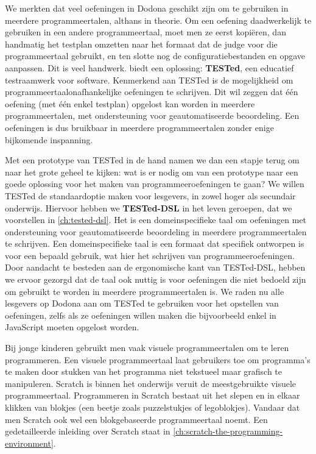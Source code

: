 \documentclass[main]{subfiles}
\begin{document}
We merkten dat veel oefeningen in Dodona geschikt zijn om te gebruiken in meerdere programmeertalen, althans in theorie.
Om een oefening daadwerkelijk te gebruiken in een andere programmeertaal, moet men ze eerst kopiëren, dan handmatig het testplan omzetten naar het formaat dat de judge voor die programmeertaal gebruikt, en ten slotte nog de configuratiebestanden en opgave aanpassen.
Dit is veel handwerk.
 biedt een oplossing: \textbf{TESTed}, een educatief testraamwerk voor software.
Kenmerkend aan TESTed is de mogelijkheid om programmeertaalonafhankelijke oefeningen te schrijven.
Dit wil zeggen dat één oefening (met één enkel testplan) opgelost kan worden in meerdere programmeertalen, met ondersteuning voor geautomatiseerde beoordeling.
Een oefeningen is dus bruikbaar in meerdere programmeertalen zonder enige bijkomende inspanning.

Met een prototype van TESTed in de hand namen we dan een stapje terug om naar het grote geheel te kijken: wat is er nodig om van een prototype naar een goede oplossing voor het maken van programmeeroefeningen te gaan?
We willen TESTed de standaardoptie maken voor lesgevers, in zowel hoger als secundair onderwijs.
Hiervoor hebben we \textbf{TESTed-DSL} in het leven geroepen, dat we voorstellen in \cref{ch:tested-dsl}.
Het is een domeinspecifieke taal om oefeningen met ondersteuning voor geautomatiseerde beoordeling in meerdere programmeertalen te schrijven.
Een domeinspecifieke taal is een formaat dat specifiek ontworpen is voor een bepaald gebruik, wat hier het schrijven van programmeeroefeningen.
Door aandacht te besteden aan de ergonomische kant van TESTed-DSL, hebben we ervoor gezorgd dat de taal ook nuttig is voor oefeningen die niet bedoeld zijn om gebruikt te worden in meerdere programmeertalen is.
We raden nu alle lesgevers op Dodona aan om TESTed te gebruiken voor het opstellen van oefeningen, zelfs als ze oefeningen willen maken die bijvoorbeeld enkel in JavaScript moeten opgelost worden.

Bij jonge kinderen gebruikt men vaak visuele programmeertalen om te leren programmeren.
Een visuele programmeertaal laat gebruikers toe om programma's te maken door stukken van het programma niet tekstueel maar grafisch te manipuleren.
Scratch is binnen het onderwijs veruit de meestgebruikte visuele programmeertaal.
Programmeren in Scratch bestaat uit het slepen en in elkaar klikken van blokjes (een beetje zoals puzzelstukjes of legoblokjes).
Vandaar dat men Scratch ook wel een blokgebaseerde programmeertaal noemt.
Een gedetailleerde inleiding over Scratch staat in \cref{ch:scratch-the-programming-environment}.
\end{document}
